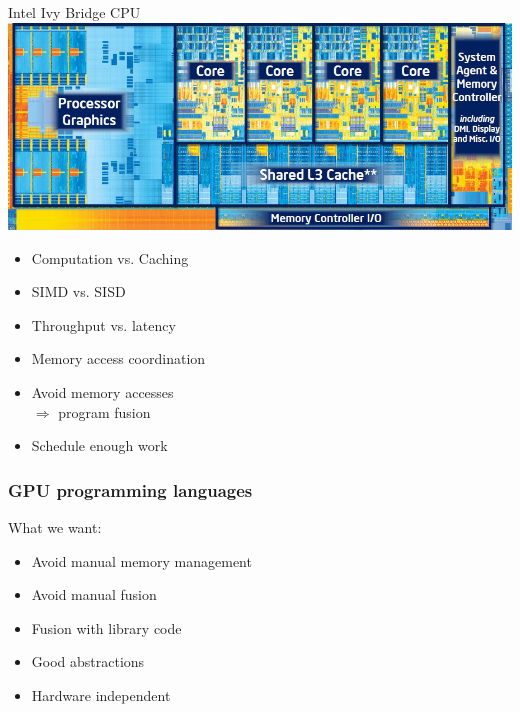 \documentclass{beamer}
\begin{document}
\begin{frame}[t]
\begin{minipage}[t]{0.55\linewidth}
    Intel Ivy Bridge CPU\vspace{0.15cm}\\
    \includegraphics[width=\textwidth]{graphics/Intel-3rd-Generation-Ivy-Bridge-Processor.jpg}
    \begin{itemize}
    \item<1|only@1> Computation vs. Caching
    \item<1|only@1> SIMD vs. SISD
    \item<1|only@1> Throughput vs. latency
    \item<2-> Memory access coordination
    \item<3-> Avoid memory accesses\\ $\Rightarrow$ program fusion
    \item<4-> Schedule enough work
    \end{itemize}
  \end{minipage}
\end{frame}


\begin{frame}
  \frametitle{GPU programming languages}

What we want:
  \begin{itemize}
  \item Avoid manual memory management
  \item Avoid manual fusion
  \item Fusion with library code
  \item Good abstractions
  \item Hardware independent
  \end{itemize}
\end{frame}
\end{document}
